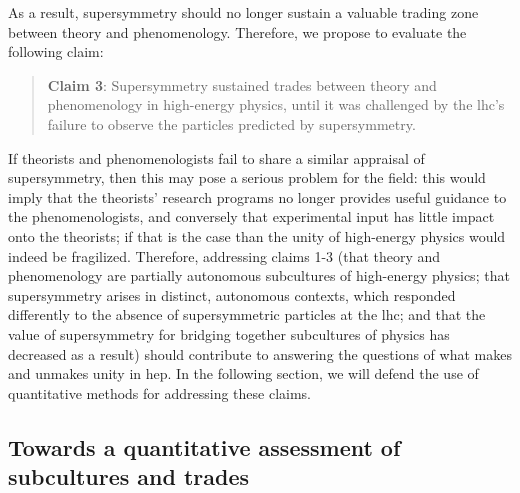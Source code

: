\documentclass[smallextended]{svjour3}
\begin{document}
As a result, supersymmetry should no longer sustain a valuable trading zone between theory and phenomenology. Therefore, we propose to evaluate the following claim:
 
\begin{quote}
    \textbf{Claim 3}: Supersymmetry sustained trades between theory and phenomenology in high-energy physics, until it was challenged by the \gls{lhc}'s failure to observe the particles predicted by supersymmetry.
\end{quote}

If theorists and phenomenologists fail to share a similar appraisal of supersymmetry, then this may pose a serious problem for the field: this would imply that the theorists' research programs no longer provides useful guidance to the phenomenologists, and conversely that experimental input has little impact onto the theorists; if that is the case than the unity of high-energy physics would indeed be fragilized. Therefore, addressing  claims 1-3 (that theory and phenomenology are partially autonomous subcultures of high-energy physics; that supersymmetry arises in distinct, autonomous contexts, which responded differently to the absence of supersymmetric particles at the \gls{lhc}; and that the value of supersymmetry for bridging together subcultures of physics has decreased as a result) should contribute to answering the questions of what makes and unmakes unity in \gls{hep}. In the following section, we will defend the use of quantitative methods for addressing these claims.%

\subsection{Towards a quantitative assessment of subcultures and trades}
\label{section:quantitative}
\end{document}
